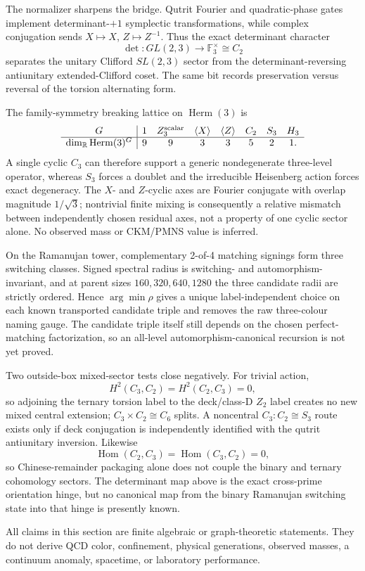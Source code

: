 The normalizer sharpens the bridge.  Qutrit Fourier and quadratic-phase gates implement determinant-\(+1\) symplectic transformations, while complex conjugation sends \(X\mapsto X\), \(Z\mapsto Z^{-1}\).  Thus the exact determinant character
\[
\det:GL(2,3)\longrightarrow\mathbb F_3^\times\cong C_2
\]
separates the unitary Clifford \(SL(2,3)\) sector from the determinant-reversing antiunitary extended-Clifford coset.  The same bit records preservation versus reversal of the torsion alternating form.

The family-symmetry breaking lattice on \(\operatorname{Herm}(3)\) is
\[
\begin{array}{c|ccccccc}
G&1&Z_3^{\rm scalar}&\langle X\rangle&\langle Z\rangle&C_2&S_3&H_3\\\hline
\dim_{\mathbb R}\operatorname{Herm}(3)^G&9&9&3&3&5&2&1.
\end{array}
\]
A single cyclic \(C_3\) can therefore support a generic nondegenerate three-level operator, whereas \(S_3\) forces a doublet and the irreducible Heisenberg action forces exact degeneracy.  The \(X\)- and \(Z\)-cyclic axes are Fourier conjugate with overlap magnitude \(1/\sqrt3\); nontrivial finite mixing is consequently a relative mismatch between independently chosen residual axes, not a property of one cyclic sector alone.  No observed mass or CKM/PMNS value is inferred.

On the Ramanujan tower, complementary 2-of-4 matching signings form three switching classes.  Signed spectral radius is switching- and automorphism-invariant, and at parent sizes \(160,320,640,1280\) the three candidate radii are strictly ordered.  Hence \(\arg\min\rho\) gives a unique label-independent choice on each known transported candidate triple and removes the raw three-colour naming gauge.  The candidate triple itself still depends on the chosen perfect-matching factorization, so an all-level automorphism-canonical recursion is not yet proved.

Two outside-box mixed-sector tests close negatively.  For trivial action,
\[
H^2(C_3,C_2)=H^2(C_2,C_3)=0,
\]
so adjoining the ternary torsion label to the deck/class-D \(Z_2\) label creates no new mixed central extension; \(C_3\times C_2\cong C_6\) splits.  A noncentral \(C_3:C_2\cong S_3\) route exists only if deck conjugation is independently identified with the qutrit antiunitary inversion.  Likewise
\[
\operatorname{Hom}(C_2,C_3)=\operatorname{Hom}(C_3,C_2)=0,
\]
so Chinese-remainder packaging alone does not couple the binary and ternary cohomology sectors.  The determinant map above is the exact cross-prime orientation hinge, but no canonical map from the binary Ramanujan switching state into that hinge is presently known.

All claims in this section are finite algebraic or graph-theoretic statements.  They do not derive QCD color, confinement, physical generations, observed masses, a continuum anomaly, spacetime, or laboratory performance.
